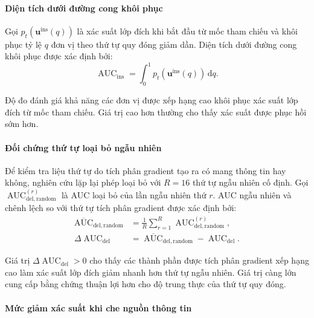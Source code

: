 \paragraph{Diện tích dưới đường cong khôi phục}

Gọi $p_t(\boldsymbol{u}^{\mathrm{ins}}(q))$ là xác suất lớp đích khi bắt đầu từ mốc tham chiếu và khôi phục tỷ lệ $q$ đơn vị theo thứ tự quy đóng giảm dần. Diện tích dưới đường cong khôi phục được xác định bởi:
\begin{equation}
\operatorname{AUC}_{\mathrm{ins}}=
\int_{0}^{1}p_t\!\left(\boldsymbol{u}^{\mathrm{ins}}(q)\right)\,\mathrm{d}q.
\label{eq:ch4_insertion_auc}
\end{equation}

Độ đo đánh giá khả năng các đơn vị được xếp hạng cao khôi phục xác suất lớp đích từ mốc tham chiếu. Giá trị cao hơn thường cho thấy xác suất được phục hồi sớm hơn.

\paragraph{Đối chứng thứ tự loại bỏ ngẫu nhiên}

Để kiểm tra liệu thứ tự do tích phân gradient tạo ra có mang thông tin hay không, nghiên cứu lặp lại phép loại bỏ với $R=16$ thứ tự ngẫu nhiên cố định. Gọi $\operatorname{AUC}^{(r)}_{\mathrm{del,random}}$ là AUC loại bỏ của lần ngẫu nhiên thứ $r$. AUC ngẫu nhiên và chênh lệch so với thứ tự tích phân gradient được xác định bởi:
\begin{equation}
\begin{aligned}
\overline{\operatorname{AUC}}_{\mathrm{del,random}}
&=\frac{1}{R}\sum_{r=1}^{R}
\operatorname{AUC}^{(r)}_{\mathrm{del,random}},\\
\Delta\operatorname{AUC}_{\mathrm{del}}
&=\overline{\operatorname{AUC}}_{\mathrm{del,random}}
-\operatorname{AUC}_{\mathrm{del}}.
\end{aligned}
\label{eq:ch4_random_deletion_delta}
\end{equation}

Giá trị $\Delta\operatorname{AUC}_{\mathrm{del}}>0$ cho thấy các thành phần được tích phân gradient xếp hạng cao làm xác suất lớp đích giảm nhanh hơn thứ tự ngẫu nhiên. Giá trị càng lớn cung cấp bằng chứng thuận lợi hơn cho độ trung thực của thứ tự quy đóng.

\paragraph{Mức giảm xác suất khi che nguồn thông tin}

